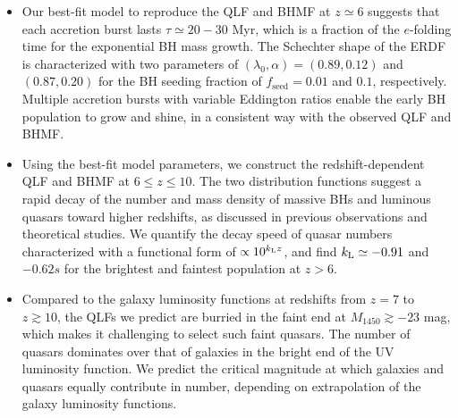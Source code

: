 \documentclass[twocolumn, twocolappendix]{aastex63}
\newcommand{\fseed}{f_\mathrm{seed}}
\newcommand{\Muv}{M_{1450}}
\newcommand{\blue}[1]{\textcolor{blue}{ #1}}
\begin{document}
\begin{CJK*}{UTF8}{gbsn}
\begin{itemize}
\item
Our best-fit model to reproduce the QLF and BHMF at $z\simeq 6$ suggests that each accretion burst
lasts $\tau \simeq 20-30$ Myr, which is a fraction of the $e$-folding time for the exponential BH mass growth.
The Schechter shape of the ERDF is characterized with two parameters of 
$(\lambda_0, \alpha)=(0.89,0.12)$ and $(0.87,0.20)$ for the BH seeding fraction of $\fseed = 0.01$ and $0.1$, respectively.
Multiple accretion bursts with variable Eddington ratios enable the early BH population to grow and shine,
in a consistent way with the observed QLF and BHMF.


\item
Using the best-fit model parameters, we construct the redshift-dependent QLF and BHMF at $6\leq z \leq 10$.
The two distribution functions suggest a rapid decay of the number and mass density of massive BHs 
and luminous quasars toward higher redshifts, as discussed in previous observations and theoretical studies.
We quantify the decay speed of quasar numbers characterized with a functional form of $\propto 10^{k_{\rm L} z}$,
and find $k_{\rm L}\simeq -0.91$ and $-0.62s$ for the brightest and faintest population at $z>6$.

\item
Compared to the galaxy luminosity functions at redshifts from $z=7$ to $z\gtrsim 10$,
the QLFs we predict are burried in the faint end at $\Muv \gtrsim -23$ mag,
which makes it challenging to select such faint quasars.
The number of quasars dominates over that of galaxies in the bright end of the UV luminosity function.
We predict the critical magnitude at which galaxies and quasars equally contribute in number,
depending on extrapolation of the galaxy luminosity functions.



\end{itemize}
\end{CJK*}
\end{document}

